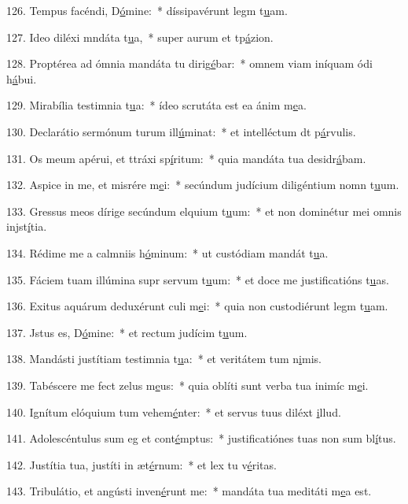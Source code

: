 126. Tempus facéndi, D\uline{ó}mine:~* díssipavérunt legm t\uline{u}am.\par 
127. Ideo diléxi mndáta t\uline{u}a,~* super aurum et tp\uline{á}zion.\par 
128. Proptérea ad ómnia mandáta tu dirig\uline{é}bar:~* omnem viam iníquam ódi h\uline{á}bui.\par 
129. Mirabília testimnia t\uline{u}a:~* ídeo scrutáta est ea ánim m\uline{e}a.\par 
130. Declarátio sermónum turum ill\uline{ú}minat:~* et intelléctum dt p\uline{á}rvulis.\par 
131. Os meum apérui, et ttráxi sp\uline{í}ritum:~* quia mandáta tua desidr\uline{á}bam.\par 
132. Aspice in me, et misrére m\uline{e}i:~* secúndum judícium diligéntium nomn t\uline{u}um.\par 
133. Gressus meos dírige secúndum elquium t\uline{u}um:~* et non dominétur mei omnis injst\uline{í}tia.\par 
134. Rédime me a calmniis h\uline{ó}minum:~* ut custódiam mandát t\uline{u}a.\par 
135. Fáciem tuam illúmina supr servum t\uline{u}um:~* et doce me justificatións t\uline{u}as.\par 
136. Exitus aquárum deduxérunt culi m\uline{e}i:~* quia non custodiérunt legm t\uline{u}am.\par 
137. Jstus es, D\uline{ó}mine:~* et rectum judícim t\uline{u}um.\par 
138. Mandásti justítiam testimnia t\uline{u}a:~* et veritátem tum n\uline{i}mis.\par 
139. Tabéscere me fect zelus m\uline{e}us:~* quia oblíti sunt verba tua inimíc m\uline{e}i.\par 
140. Ignítum elóquium tum vehem\uline{é}nter:~* et servus tuus diléxt \uline{i}llud.\par 
141. Adolescéntulus sum eg et cont\uline{é}mptus:~* justificatiónes tuas non sum bl\uline{í}tus.\par 
142. Justítia tua, justíti in æt\uline{é}rnum:~* et lex tu v\uline{é}ritas.\par 
143. Tribulátio, et angústi inven\uline{é}runt me:~* mandáta tua meditáti m\uline{e}a est.\par 
